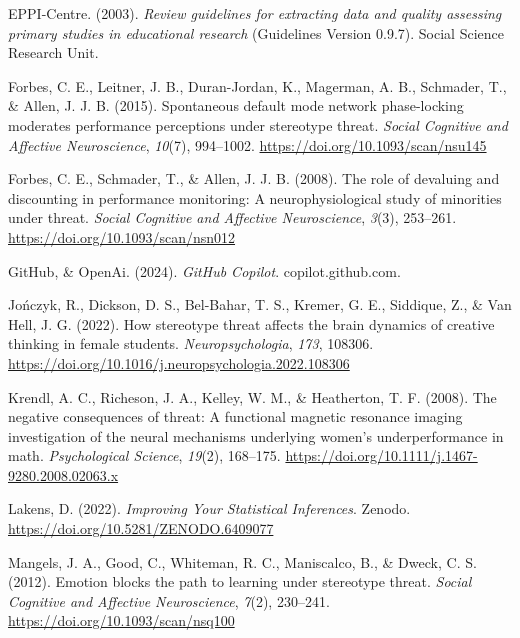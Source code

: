 \documentclass[
  stu]{apa7}
\newlength{\cslhangindent}
\newenvironment{CSLReferences}[2] %
 {\begin{list}{}{%
  \setlength{\itemindent}{0pt}
  \setlength{\leftmargin}{0pt}
  \setlength{\parsep}{0pt}
  \ifodd #1
   \setlength{\leftmargin}{\cslhangindent}
   \setlength{\itemindent}{-1\cslhangindent}
  \fi
  \setlength{\itemsep}{#2\baselineskip}}}
 {\end{list}}
\begin{document}
\begin{CSLReferences}{1}{0}
EPPI-Centre. (2003). \emph{Review guidelines for extracting data and quality assessing primary studies in educational research} (Guidelines Version 0.9.7). Social Science Research Unit.

Forbes, C. E., Leitner, J. B., Duran-Jordan, K., Magerman, A. B., Schmader, T., \& Allen, J. J. B. (2015). Spontaneous default mode network phase-locking moderates performance perceptions under stereotype threat. \emph{Social Cognitive and Affective Neuroscience}, \emph{10}(7), 994--1002. \url{https://doi.org/10.1093/scan/nsu145}

Forbes, C. E., Schmader, T., \& Allen, J. J. B. (2008). The role of devaluing and discounting in performance monitoring: A neurophysiological study of minorities under threat. \emph{Social Cognitive and Affective Neuroscience}, \emph{3}(3), 253--261. \url{https://doi.org/10.1093/scan/nsn012}

GitHub, \& OpenAi. (2024). \emph{{GitHub Copilot}}. copilot.github.com.

Jończyk, R., Dickson, D. S., Bel-Bahar, T. S., Kremer, G. E., Siddique, Z., \& Van Hell, J. G. (2022). How stereotype threat affects the brain dynamics of creative thinking in female students. \emph{Neuropsychologia}, \emph{173}, 108306. \url{https://doi.org/10.1016/j.neuropsychologia.2022.108306}

Krendl, A. C., Richeson, J. A., Kelley, W. M., \& Heatherton, T. F. (2008). The negative consequences of threat: A functional magnetic resonance imaging investigation of the neural mechanisms underlying women's underperformance in math. \emph{Psychological Science}, \emph{19}(2), 168--175. \url{https://doi.org/10.1111/j.1467-9280.2008.02063.x}

Lakens, D. (2022). \emph{Improving {Your Statistical Inferences}}. Zenodo. \url{https://doi.org/10.5281/ZENODO.6409077}

Mangels, J. A., Good, C., Whiteman, R. C., Maniscalco, B., \& Dweck, C. S. (2012). Emotion blocks the path to learning under stereotype threat. \emph{Social Cognitive and Affective Neuroscience}, \emph{7}(2), 230--241. \url{https://doi.org/10.1093/scan/nsq100}


\end{CSLReferences}
\end{document}
